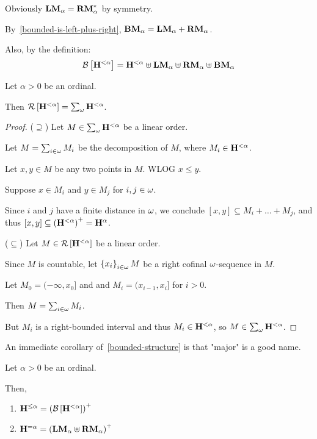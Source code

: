 \begin{note}
  Obviously $\mathbf{LM}_{\alpha} = \mathbf{RM}_{\alpha}^\ast$ by symmetry.

  By~\cref{bounded-is-left-plus-right}, $\mathbf{BM}_{\alpha} = \mathbf{LM}_{\alpha} + \mathbf{RM}_{\alpha}$.

  Also, by the definition:
  \[
    \mathcal{B} \left[ {{\mathbf{H}_{}^{< \alpha}}} \right] = \mathbf{H}_{}^{< \alpha} \uplus \mathbf{LM}_{\alpha}
    \uplus \mathbf{RM}_{\alpha} \uplus \mathbf{BM}_{\alpha}
  \]
\end{note}

\begin{lemma}\label{bounded-structure}
  Let $\alpha > 0$ be an ordinal.

  Then $\mathcal{R} \left[ {{\mathbf{H}_{}^{< \alpha}}} \right] = \sum_{\omega}{\mathbf{H}_{}^{< \alpha}}$.
\end{lemma}

\begin{proof}
  ($\supseteq$) Let $M \in \sum_{\omega}{\mathbf{H}_{}^{< \alpha}}$ be a linear order.

  Let $M = \sum_{i \in \omega} M_i$ be the decomposition of $M$,
  where $M_i \in \mathbf{H}_{}^{< \alpha}$.

  Let $x, y \in M$ be any two points in $M$. WLOG $x \le y$.

  Suppose $x \in M_i$ and $y \in M_j$ for $i, j \in \omega$.

  Since $i$ and $j$ have a finite distance in $\omega$,
  we conclude $[x, y] \subseteq M_i + \ldots + M_j$,
  and thus $[x, y] \subseteq \left( {\mathbf{H}_{}^{< \alpha}} \right)^+ = \mathbf{H}_{}^{{\alpha}}$.

  ($\subseteq$) Let $M \in \mathcal{R} \left[ {{\mathbf{H}_{}^{< \alpha}}} \right]$ be a linear order.

  Since $M$ is countable, let $\left\{ {x_i} \right\}_{i \in \omega} M$ be a right cofinal
  $\omega$-sequence in $M$.

  Let $M_0 = (-\infty, x_0]$ and and $M_i = (x_{i-1}, x_{i}]$ for $i > 0$.

  Then $M = \sum_{i \in \omega} M_i$.

  But $M_i$ is a right-bounded interval and thus $M_i \in \mathbf{H}_{}^{< \alpha}$, so $M \in \sum_{\omega}{\mathbf{H}_{}^{< \alpha}}$.
\end{proof}

An immediate corollary of~\cref{bounded-structure} is that "major" is a good name.
\begin{corollary}\label{le-alpha-corollary}
  Let $\alpha > 0$ be an ordinal.

  Then,
  \begin{enumerate}
    \item $\mathbf{H}_{}^{\le \alpha} = \left( {\mathcal{B} \left[ {{\mathbf{H}_{}^{< \alpha}}} \right]} \right)^+$
    \item $\mathbf{H}_{}^{= \alpha} = \left( { \mathbf{LM}_{\alpha} \uplus \mathbf{RM}_{\alpha} } \right)^+$
  \end{enumerate}
\end{corollary}

